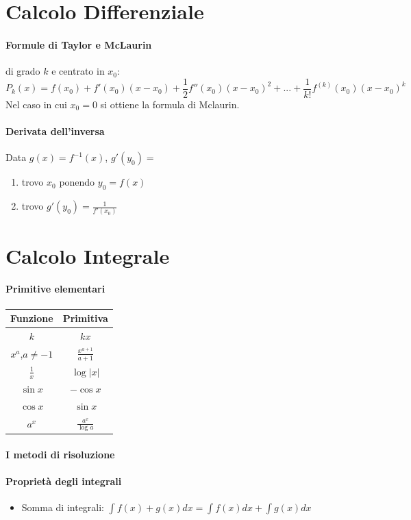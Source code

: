 \documentclass[12pt, a4paper, openany]{book}
\begin{document}
\section*{Calcolo Differenziale}
\paragraph*{Formule di Taylor e McLaurin} di grado $k$ e centrato in $x_0$:
$$P_k(x)=f(x_0)+f'(x_0)(x-x_0) + \frac{1}{2}f''(x_0)(x-x_0)^2 +... + \frac{1}{k!}f^{(k)}(x_0)(x-x_0)^k$$
Nel caso in cui $x_0=0$ si ottiene la formula di Mclaurin.
\paragraph*{Derivata dell'inversa} Data $g(x) = f^{-1}(x)$, $g'(y_0)=$
\begin{enumerate}
	\item trovo $x_0$ ponendo $y_0=f(x)$
	\item trovo $g'(y_0)=\frac{1}{f'(x_0)}$
\end{enumerate}


\section*{Calcolo Integrale}
\paragraph*{Primitive elementari}
\begin{tabular}{ |c|c| }
	\hline
	Funzione & Primitiva\\
	\hline
	$k$ & $kx$\\
	$x^a$,$a\neq-1$ & $\frac{x^{a+1}}{a+1}$\\
	$\frac{1}{x}$ & $\log|x|$\\
	$\sin x$ & $-\cos x$\\
	$\cos x $&$\sin x$\\
	$a^x$ & $\frac{a^x}{\log a}$\\
	\hline
\end{tabular}
\paragraph*{I metodi di risoluzione}
\paragraph*{Proprietà degli integrali}
\begin{itemize}
	\item Somma di integrali: $\int f(x)+g(x) dx = \int f(x) dx + \int g(x) dx$  
\end{itemize}
\end{document}
